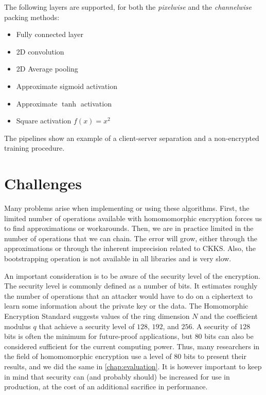 \documentclass[a4paper,11pt,oneside]{report}
\begin{document}
The following layers are supported, for both the \emph{pixelwise} and the \emph{channelwise} packing methods:
\begin{itemize}
  \item Fully connected layer
  \item 2D convolution
  \item 2D Average pooling
  \item Approximate sigmoid activation
  \item Approximate $\tanh$ activation
  \item Square activation $f(x) = x^2$
\end{itemize}

The pipelines show an example of a client-server separation and a non-encrypted training procedure.


\section{Challenges}

Many problems arise when implementing or using these algorithms. 
First, the limited number of operations available with homomomorphic encryption forces us to find approximations or workarounds. 
Then, we are in practice limited in the number of operations that we can chain. 
The error will grow, either through the approximations or through the inherent imprecision related to CKKS. 
Also, the bootstrapping operation is not available in all libraries and is very slow.

An important consideration is to be aware of the security level of the encryption. 
The security level is commonly defined as a number of bits. 
It estimates roughly the number of operations that an attacker would have to do on a ciphertext to learn some information about the private key or the data.
The Homomorphic Encryption Standard \cite{albrecht_homomorphic_2021} suggests values of the ring dimension $N$ and the coefficient modulus $q$ that achieve a security level of $128$, $192$, and $256$. 
A security of $128$ bits is often the minimum for future-proof applications, but $80$ bits can also be considered sufficient for the current computing power.
Thus, many researchers in the field of homomomorphic encryption use a level of $80$ bits to present their results, and we did the same in \autoref{chap:evaluation}.
It is however important to keep in mind that security can (and probably should) be increased for use in production, at the cost of an additional sacrifice in performance.
\end{document}
